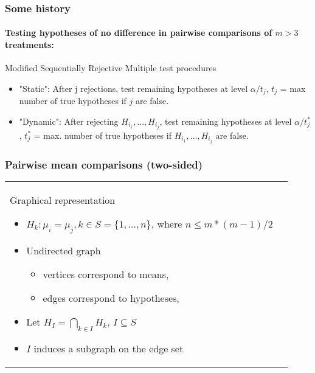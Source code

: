 \documentclass[bigger]{beamer}
\begin{document}
\begin{frame}
\frametitle{Some history}
\framesubtitle{Testing hypotheses of no difference in pairwise
    comparisons of $m>3$ treatments:}

  Modified Sequentially Rejective
  Multiple test procedures \cite{shaffer1986modified} %
      \begin{itemize}
      \item "Static":  After j rejections, test remaining hypotheses at level $\alpha/t_j$, $t_j$ = max number of true hypotheses if $j$ are false.
      \item "Dynamic": After rejecting $H_{i_1},...,H_{i_j}$, test
        remaining hypotheses at level $\alpha/t^*_j$,  $t^*_j$ =
        max. number of true hypotheses if $H_{i_1},...,H_{i_j}$ are
        false.
      \end{itemize}


\end{frame}



\begin{frame}
\frametitle{Pairwise mean comparisons (two-sided)}
\begin{tabular}{ll}

  \begin{minipage}{.5\textwidth}
    
  \end{minipage} 
  \begin{minipage}{.5\textwidth}
    \begin{block}{Graphical representation}
      \begin{itemize}
      \item $H_k: \mu_i = \mu_j, k \in S = \{1,...,n\}$, where $n \leq
        m*(m-1)/2$

      \item Undirected graph %
        \begin{itemize}
        \item vertices correspond to means, 
        \item edges correspond to hypotheses, 
        \end{itemize}
      \item Let $H_I = \bigcap_{k \in I} H_k$, $I \subseteq S$
      \item $I$ induces a subgraph %
        on the edge set
      \end{itemize} %
    \end{block}
  \end{minipage} 

\end{tabular}
\end{frame}
\end{document}
